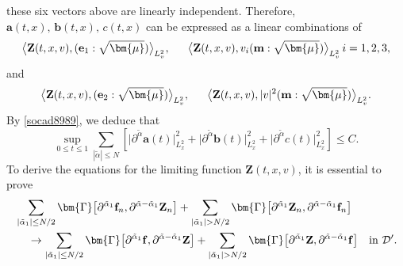 \documentclass[reqno]{amsart}
\numberwithin{equation}{section}
\numberwithin{equation}{section}
\begin{document}
		 these six vectors above are linearly independent.  Therefore, $ \mathbf{a}(t,x),\,\mathbf{b}(t,x),\,c(t,x) $ can be expressed as a linear combinations of
		$$
		\big\langle  \mathbf{Z}(t,x,v), (\mathbf{e}_1:\sqrt{\bm{\mu}}) \big\rangle_{L^{2}_{v}},\,
		\hspace{0.5cm}\big\langle  \mathbf{Z}(t,x,v), v_i(\mathbf{m}:\sqrt{\bm{\mu}}) \big\rangle_{L^{2}_{v}}\,i=1,2,3,
		$$
		and
		$$
		\big\langle  \mathbf{Z}(t,x,v), (\mathbf{e}_2:\sqrt{\bm{\mu}}) \big\rangle_{L^{2}_{v}},\,\hspace{0.5cm}\big\langle  \mathbf{Z}(t,x,v), |v|^2(\mathbf{m}:\sqrt{\bm{\mu}}) \big\rangle_{L^{2}_{v}}.
		$$
		By \eqref{socad8989}, we deduce that
		\begin{equation}
		\sup_{0 \leq t \leq 1} \sum_{|\tilde{\alpha}| \leq N} \left[ \big|\partial^{\tilde{\alpha}} \mathbf{a}(t)\big|_{L^{2}_{x}}^2 + \big|\partial^{\tilde{\alpha}} \mathbf{b}(t)\big|_{L^{2}_{x}}^2 + \big|\partial^{\tilde{\alpha}} c(t)\big|_{L^{2}_{x}}^2 \right] \leq C. \label{socad101101}
		\end{equation}
		To derive the equations for the limiting function $ \mathbf{Z}(t,x,v) $, it is essential to prove 
		\begin{align}
			&\sum_{|\tilde{\alpha}_1| \leq N/2} \bm{\Gamma}\big[\partial^{\tilde{\alpha}_1} \mathbf{f}_n, \partial^{\tilde{\alpha} - \tilde{\alpha}_1} \mathbf{Z}_n\big] + \sum_{|\tilde{\alpha}_1| > N/2} \bm{\Gamma}\big[\partial^{\tilde{\alpha}_1} \mathbf{Z}_n, \partial^{\tilde{\alpha} - \tilde{\alpha}_1} \mathbf{f}_n\big] \notag\\
			&\hspace{0.4cm}\to \sum_{|\tilde{\alpha}_1| \leq N/2} \bm{\Gamma}\big[\partial^{\tilde{\alpha}_1} \mathbf{f}, \partial^{\tilde{\alpha} - \tilde{\alpha}_1} \mathbf{Z}\big] + \sum_{|\tilde{\alpha}_1| > N/2} \bm{\Gamma}\big[\partial^{\tilde{\alpha}_1} \mathbf{Z}, \partial^{\tilde{\alpha} - \tilde{\alpha}_1} \mathbf{f}\big] \quad \text{in } \mathcal{D}'. \label{secd102102}
		\end{align}
\end{document}
